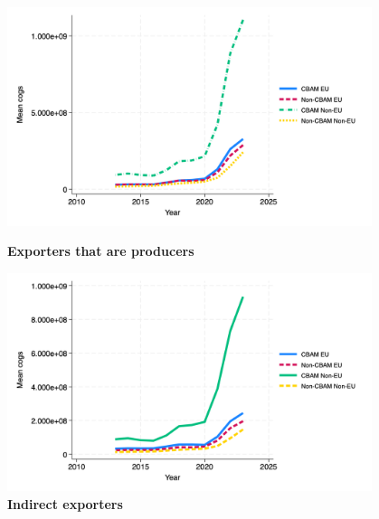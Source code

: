 \documentclass{article}
\begin{document}
\begin{figure}[H]
\centering
\includegraphics[width=0.95\textwidth]{cogs_ep.png}
\caption{\textbf{Exporters that are producers}}
\includegraphics[width=0.95\textwidth]{cogs_indir.png}
\caption{\textbf{Indirect exporters}}
\end{figure}
\end{document}
